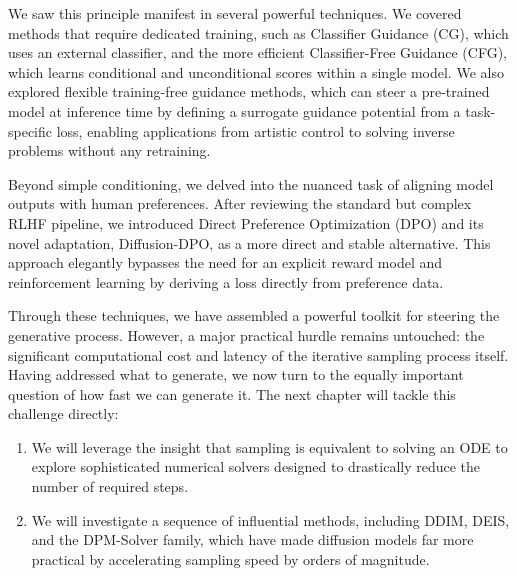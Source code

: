 We saw this principle manifest in several powerful techniques. We covered methods that require dedicated training, such as Classifier Guidance (CG), which uses an external classifier, and the more efficient Classifier-Free Guidance (CFG), which learns conditional and unconditional scores within a single model. We also explored flexible training-free guidance methods, which can steer a pre-trained model at inference time by defining a surrogate guidance potential from a task-specific loss, enabling applications from artistic control to solving inverse problems without any retraining.

Beyond simple conditioning, we delved into the nuanced task of aligning model outputs with human preferences. After reviewing the standard but complex RLHF pipeline, we introduced Direct Preference Optimization (DPO) and its novel adaptation, Diffusion-DPO, as a more direct and stable alternative. This approach elegantly bypasses the need for an explicit reward model and reinforcement learning by deriving a loss directly from preference data.


Through these techniques, we have assembled a powerful toolkit for steering the generative process. However, a major practical hurdle remains untouched: the significant computational cost and latency of the iterative sampling process itself. Having addressed what to generate, we now turn to the equally important question of how fast we can generate it. The next chapter will tackle this challenge directly:
\begin{enumerate}
    \item We will leverage the insight that sampling is equivalent to solving an ODE to explore sophisticated numerical solvers designed to drastically reduce the number of required steps.
    \item We will investigate a sequence of influential methods, including DDIM, DEIS, and the DPM-Solver family, which have made diffusion models far more practical by accelerating sampling speed by orders of magnitude.
\end{enumerate}

